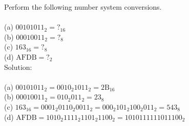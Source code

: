 Perform the following number system conversions. \\
\\
(a) $00101011_2 = ?_{16}$ \\
(b) $00010011_2 = ?_8$ \\
(c) $163_{16} = ?_8$ \\
(d) $\textrm{AFDB} = ?_2$ \\

Solution: \\
\\
(a) $00101011_2 = 0010_2 1011_2 = 2\textrm{B}_{16}$ \\
(b) $00010011_2 = 010_2 011_2 = 23_8$ \\
(c) $163_{16} = 0001_2 0110_2 0011_2 = 000_2 101_2 100_2 011_2 = 543_8$ \\
(d) $\textrm{AFDB} = 1010_2 1111_2 1101_2 1100_2 = 1010111111011100_2$ \\
\\
